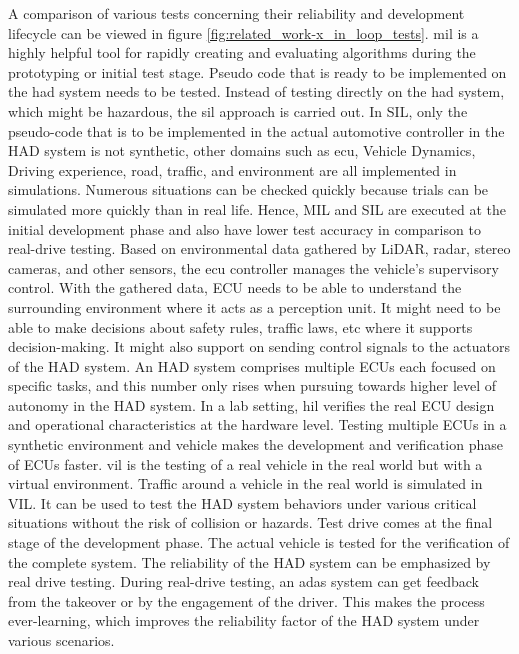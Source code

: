 A comparison of various tests concerning their reliability and development lifecycle can be viewed in figure \ref{fig:related_work-x_in_loop_tests}. \acrfull{mil} is a highly helpful tool for rapidly creating and evaluating algorithms during the prototyping or initial test stage. Pseudo code that is ready to be implemented on the \acrshort{had} system needs to be tested. Instead of testing directly on the \acrshort{had} system, which might be hazardous, the \acrfull{sil} approach is carried out. In SIL, only the pseudo-code that is to be implemented in the actual automotive controller in the HAD system is not synthetic, other domains such as \acrfull{ecu}, Vehicle Dynamics, Driving experience, road, traffic, and environment are all implemented in simulations. Numerous situations can be checked quickly because trials can be simulated more quickly than in real life. Hence, MIL and SIL are executed at the initial development phase and also have lower test accuracy in comparison to real-drive testing. Based on environmental data gathered by LiDAR, radar, stereo cameras, and other sensors, the \acrfull{ecu} controller manages the vehicle's supervisory control. With the gathered data, ECU needs to be able to understand the surrounding environment where it acts as a perception unit. It might need to be able to make decisions about safety rules, traffic laws, etc where it supports decision-making. It might also support on sending control signals to the actuators of the HAD system. An HAD system comprises multiple ECUs each focused on specific tasks, and this number only rises when pursuing towards higher level of autonomy in the HAD system. In a lab setting, \acrfull{hil} verifies the real ECU design and operational characteristics at the hardware level. Testing multiple ECUs in a synthetic environment and vehicle makes the development and verification phase of ECUs faster. \acrfull{vil} is the testing of a real vehicle in the real world but with a virtual environment. Traffic around a vehicle in the real world is simulated in VIL. It can be used to test the HAD system behaviors under various critical situations without the risk of collision or hazards. Test drive comes at the final stage of the development phase. The actual vehicle is tested for the verification of the complete system. The reliability of the HAD system can be emphasized by real drive testing. During real-drive testing, an \acrfull{adas} system can get feedback from the takeover or by the engagement of the driver. This makes the process ever-learning, which improves the reliability factor of the HAD system under various scenarios.


